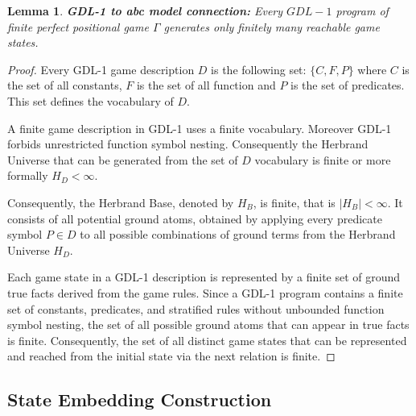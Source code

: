 \documentclass[11pt,a4paper]{article}
\theoremstyle{plain}
\newtheorem{lemma}[theorem]{Lemma}
\theoremstyle{definition}
\begin{document}
\begin{lemma}\textbf{GDL-1 to abc model connection:}
Every $GDL-1$ program of finite perfect positional game $\Gamma$ generates only finitely many reachable game states.
\label{lem:GDL-1_to_abc}
\end{lemma}
\begin{proof}

\vspace{0.5em}

Every GDL-1 game description $D$ is the following set: $\{C, F, P\}$ where $C$ is the set of all constants, $F$ is the set of all function and $P$ is the set of predicates. This set defines the vocabulary of $D$.

\vspace{0.5em}

A finite game description in GDL-1 uses a finite vocabulary. Moreover GDL-1 forbids unrestricted function symbol nesting. Consequently the Herbrand Universe that can be generated from the set of $D$ vocabulary is finite or more formally $H_D<\infty$.

\vspace{0.5em}

Consequently, the Herbrand Base, denoted by \( H_B \), is finite, that is \( |H_B| < \infty \). 
It consists of all potential ground atoms, obtained by applying every predicate symbol \( P \in D \) 
to all possible combinations of ground terms from the Herbrand Universe \( H_D \).

\vspace{0.5em}

Each game state in a GDL-1 description is represented by a finite set of ground true facts derived from the game rules. Since a GDL-1 program contains a finite set of constants, predicates, and stratified rules without unbounded function symbol nesting, the set of all possible ground atoms that can appear in true facts is finite. Consequently, the set of all distinct game states that can be represented and reached from the initial state via the next relation is finite.

\vspace{0.5em}

\end{proof}

\vspace{0.5em}

\subsection{State Embedding Construction}
\end{document}
